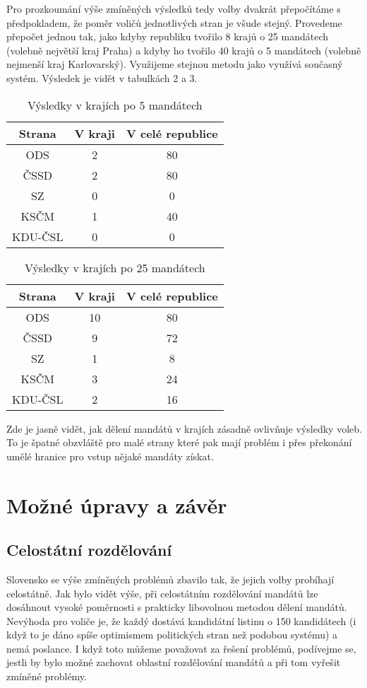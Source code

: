\documentclass[12pt]{report}
\begin{document}
Pro prozkoumání výše zmíněných výsledků tedy volby dvakrát přepočítáme s předpokladem, že poměr voličů jednotlivých stran je všude stejný.
Provedeme přepočet jednou tak, jako kdyby republiku tvořilo 8 krajů o 25 mandátech (volebně největší kraj Praha) a kdyby ho tvořilo 40 krajů o 5 mandátech (volebně nejmenší kraj Karlovarský).
Využijeme stejnou metodu jako využívá současný systém.
Výsledek je vidět v tabulkách 2 a 3.
\begin{table} \begin{center} \begin{tabular}{|c|c|c|}
\hline Strana & V kraji & V celé republice\\
\hline ODS & 2 & 80\\
\hline ČSSD & 2 & 80\\
\hline SZ & 0 & 0\\
\hline KSČM & 1 & 40\\
\hline KDU-ČSL & 0 & 0\\
\hline
\end{tabular}
\caption{Výsledky v krajích po 5 mandátech}
\end{center}
\end{table}
\begin{table}
\begin{center}
\begin{tabular}{|c|c|c|} 
\hline Strana & V kraji & V celé republice\\
\hline ODS & 10 & 80\\
\hline ČSSD & 9 & 72\\
\hline SZ & 1 & 8\\
\hline KSČM & 3 & 24\\
\hline KDU-ČSL & 2 & 16\\
\hline
\end{tabular}
\caption{Výsledky v krajích po 25 mandátech}
\end{center}
\end{table}
Zde je jasně vidět, jak dělení mandátů v krajích zásadně ovlivňuje výsledky voleb.
To je špatné obzvláště pro malé strany které pak mají problém i přes překonání umělé hranice pro vstup nějaké mandáty získat.
\chapter{Možné úpravy a závěr}
\section{Celostátní rozdělování}
Slovensko se výše zmíněných problémů zbavilo tak, že jejich volby probíhají celostátně.
Jak bylo vidět výše, při celostátním rozdělování mandátů lze dosáhnout vysoké poměrnosti s prakticky libovolnou metodou dělení mandátů.
Nevýhoda pro voliče je, že každý dostává kandidátní listinu o 150 kandidátech (i když to je dáno spíše optimismem politických stran než podobou systému) a nemá  poslance.
I když toto můžeme považovat za řešení problémů, podívejme se, jestli by bylo možné zachovat oblastní rozdělování mandátů a při tom vyřešit zmíněné problémy.
\end{document}
